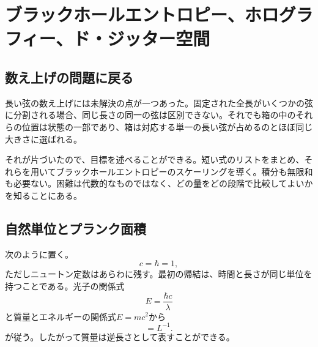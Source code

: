 \chapter{ブラックホールエントロピー、ホログラフィー、ド・ジッター空間}


\section{数え上げの問題に戻る}

長い弦の数え上げには未解決の点が一つあった。固定された全長がいくつかの弦に分割される場合、同じ長さの同一の弦は区別できない。それでも箱の中のそれらの位置は状態の一部であり、箱は対応する単一の長い弦が占めるのとほぼ同じ大きさに選ばれる。

\begin{classroomqa}
\end{classroomqa}

それが片づいたので、目標を述べることができる。短い式のリストをまとめ、それらを用いてブラックホールエントロピーのスケーリングを導く。積分も無限和も必要ない。困難は代数的なものではなく、どの量をどの段階で比較してよいかを知ることにある。

\section{自然単位とプランク面積}

次のように置く。
\begin{equation}
c=\hbar=1,
\label{eq:l07-natural-units}
\end{equation}
ただしニュートン定数はあらわに残す。最初の帰結は、時間と長さが同じ単位を持つことである。光子の関係式
\begin{equation}
E=\frac{\hbar c}{\lambda}
\end{equation}
と質量とエネルギーの関係式\(E=mc^2\)から
\begin{equation}
[M]=L^{-1}.
\label{eq:l07-mass-dimension}
\end{equation}
が従う。したがって質量は逆長さとして表すことができる。

